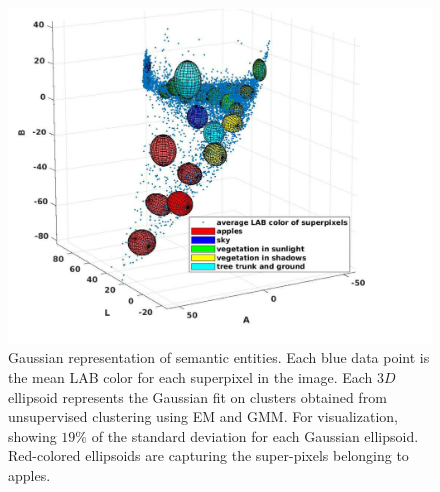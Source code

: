 \begin{figure}[!hbpt]
\centering
    \includegraphics[width= \columnwidth]{figures/detection/all_semantic_entities1.pdf}                  
    \caption[Gaussian representation of semantic entities.]{Gaussian representation of semantic entities. Each blue data point is the mean LAB color for each superpixel in the image. Each $3D$ ellipsoid represents the Gaussian fit on clusters obtained from unsupervised clustering using EM and GMM. For visualization, showing $19\%$ of the standard deviation for each Gaussian ellipsoid. Red-colored ellipsoids are capturing the super-pixels belonging to apples.}
    \label{fig:all_semantic_entities}
\end{figure}


